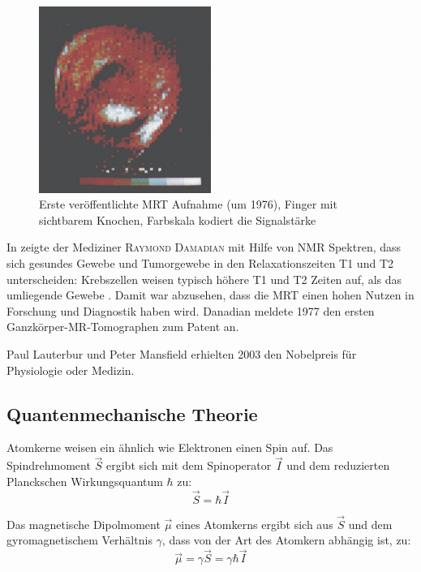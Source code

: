 \begin{figure}[H]
	\centering
	\includegraphics[width=0.5\textwidth]{img/ext/mansfieldFinger.png}
	\caption[Erste MRT Aufnahme von Mansfield]{Erste veröffentlichte MRT Aufnahme (um 1976), Finger mit sichtbarem Knochen, Farbskala kodiert die Signalstärke \cite{Mansfield1977a}}
	\label{fig:mansfieldFinger}
\end{figure}

In \cite{Damadian1971} zeigte der Mediziner \textsc{Raymond Damadian} mit Hilfe von NMR Spektren, dass sich gesundes Gewebe und Tumorgewebe in den Relaxationszeiten T1 und T2 unterscheiden: Krebszellen weisen typisch höhere T1 und T2 Zeiten auf, als das umliegende Gewebe \cite{Damadian1971}. Damit war abzusehen, dass die MRT einen hohen Nutzen in Forschung und Diagnostik haben wird. Danadian meldete 1977 den ersten Ganzkörper-MR-Tomographen zum Patent an.

Paul Lauterbur und Peter Mansfield erhielten 2003 den Nobelpreis für Physiologie oder Medizin.


\subsection{Quantenmechanische Theorie}
\label{sec:nmrTheory}
Atomkerne weisen ein ähnlich wie Elektronen einen Spin auf. Das Spindrehmoment $\vec{S}$ ergibt sich mit dem Spinoperator $\vec{I}$ und dem reduzierten Planckschen Wirkungsquantum $\hbar$ zu:
\begin{equation}
	\vec{S}=\hbar \vec{I}
\end{equation}

Das magnetische Dipolmoment $\vec{\mu}$ eines Atomkerns ergibt sich aus $\vec{S}$ und dem gyromagnetischem Verhältnis $\gamma$, dass von der Art des Atomkern abhängig ist, zu:
\begin{equation}
	\vec{\mu}=\gamma \vec{S} = \gamma \hbar \vec{I}
\end{equation}

